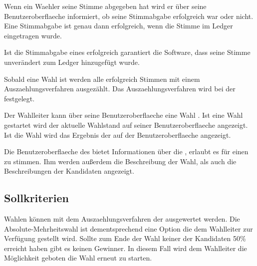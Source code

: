 \documentclass[parskip=full,11pt,twoside]{scrartcl}
\begin{document}
\pagebreak

Wenn ein \gls{Waehler} seine \gls{Stimme} abgegeben hat wird er über seine \gls{Benutzeroberflaeche} informiert, ob seine \gls{Stimmabgabe} erfolgreich war oder nicht. Eine \gls{Stimmabgabe} ist genau dann erfolgreich, wenn die \gls{Stimme} im \gls{Ledger} eingetragen wurde.

Ist die \gls{Stimmabgabe} eines  erfolgreich garantiert die Software, dass seine \gls{Stimme} unverändert zum \gls{Ledger} hinzugefügt wurde.

Sobald eine \gls{Wahl}  ist werden alle erfolgreich  Stimmen mit einem \gls{Auszaehlungsverfahren} ausgezählt. Das \gls{Auszaehlungsverfahren} wird bei der  festgelegt.

Der \gls{Wahlleiter} kann über seine \gls{Benutzeroberflaeche} eine Wahl . Ist eine \gls{Wahl} gestartet wird der aktuelle \gls{Wahlstand} auf seiner \gls{Benutzeroberflaeche} angezeigt. Ist die Wahl  wird das Ergebnis der  auf der \gls{Benutzeroberflaeche} angezeigt.

Die \gls{Benutzeroberflaeche} des  bietet Informationen über die , erlaubt es für einen  zu stimmen. Ihm werden außerdem die Beschreibung der Wahl, als auch die Beschreibungen der Kandidaten angezeigt.

\pagebreak

\subsection{Sollkriterien}

Wahlen können mit dem \gls{Auszaehlungsverfahren} der  ausgewertet werden. Die \gls{Absolute-Mehrheitswahl} ist dementsprechend eine Option die dem \gls{Wahlleiter} zur Verfügung gestellt wird.
Sollte zum Ende der Wahl keiner der Kandidaten 50\% erreicht haben gibt es keinen Gewinner.
In diesem Fall wird dem Wahlleiter die Möglichkeit geboten die Wahl erneut zu starten.
\end{document}
